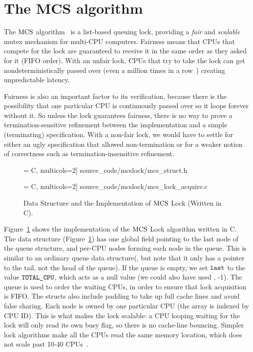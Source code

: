 \section{The MCS algorithm}
\label{chapter:mcslock:sec:overview}

The $\mathrm{MCS}$ algorithm~\cite{mcs91} is a list-based queuing lock,
providing a \emph{fair} and \emph{scalable} mutex mechanism for
multi-CPU computers. Fairness means that
CPUs that compete for the lock are guaranteed to receive it in the same
order as they asked for it (FIFO order). With an unfair lock, CPUs
that try to take the lock can get nondeterministically passed over
(even a million times in a row~\cite{lwn:ticketlocks}) creating
unpredictable latency.

Fairness is also an important factor to its verification, because
there is the possibility that one particular CPU is continuously
passed over so it loops forever without it.
So unless the lock
guarantees fairness, there is no way to prove a termination-sensitive
refinement between the implementation and a simple (terminating)
specification. With a non-fair lock, we would have to settle for
either an ugly specification that allowed non-termination or for a weaker notion of correctness such as termination-insensitive
refinement.
\begin{figure}
 = C, multicols=2] {source_code/mcslock/mcs_struct.h}
\vspace{1em}

 = C, multicols=2] {source_code/mcslock/mcs_lock_acquire.c}
\caption{Data Structure and the Implementation of $\mathrm{MCS}$ Lock (Written in C).}
\label{fig:chapter:mcslock:mcs_lock}
\end{figure}

Figure~\ref{fig:chapter:mcslock:mcs_lock} shows the implementation of the $\mathrm{MCS}$ Lock algorithm written in C. 
The data structure  (Figure~\ref{fig:chapter:mcslock:mcs_lock}) has
one global field pointing to the last node of the queue structure, and
per-CPU nodes forming each node in the queue. This is similar to an
ordinary queue data structure(, but note that it only has a
pointer to the tail, not the head of the queue).  If the queue is
empty, we set ${\mathrm{\texttt{last}}}$ to the value ${\mathrm{\texttt{TOTAL\_CPU}}}$, which
acts as a null value (we could also have used \eg, -1). The queue is
used to order the waiting CPUs, in order to ensure that lock
acquisition is FIFO. The structs also include padding to take up full cache lines and avoid false sharing.  Each node is owned by one
particular CPU (the array is indexed by CPU ID).  This is what makes
the lock scalable: a CPU looping waiting for the lock will only read
its own busy flag, so there is no cache-line bouncing. Simpler lock
algorithms make all the CPUs read the same memory location, which does
not scale past 10-40 CPUs~\cite{Boyd-wickizer12}.

